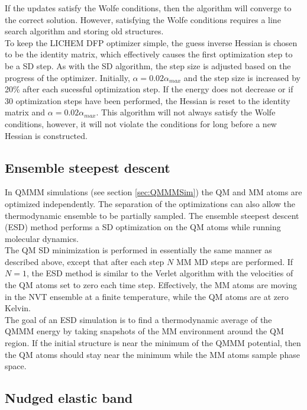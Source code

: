 \documentclass[12pt]{report}
\begin{document}
If the updates satisfy the Wolfe conditions, then the algorithm will converge
to the correct solution.
However, satisfying the Wolfe conditions requires a line search algorithm and
storing old structures. \\

To keep the LICHEM DFP optimizer simple, the guess inverse Hessian is chosen
to be the identity matrix, which effectively causes the first optimization
step to be a SD step.
As with the SD algorithm, the step size is adjusted based on the progress of
the optimizer.
Initially, $\alpha=0.02\alpha_{max}$ and the step size is increased by 20\%
after each sucessful optimization step.
If the energy does not decrease or if 30 optimization steps have been
performed, the Hessian is reset to the identity matrix and
$\alpha=0.02\alpha_{max}$.
This algorithm will not always satisfy the Wolfe conditions, however, it will
not violate the conditions for long before a new Hessian is constructed.

\subsection{Ensemble steepest descent}

In QMMM simulations (see section \ref{sec:QMMMSim}) the QM and MM atoms are
optimized independently.
The separation of the optimizations can also allow the thermodynamic ensemble
to be partially sampled.
The ensemble steepest descent (ESD) method performs a SD optimization on the
QM atoms while running molecular dynamics. \\

The QM SD minimization is performed in essentially the same manner as described
above, except that after each step $N$ MM MD steps are performed.
If $N=1$, the ESD method is similar to the Verlet algorithm with the
velocities of the QM atoms set to zero each time step.
Effectively, the MM atoms are moving in the NVT ensemble at a finite
temperature, while the QM atoms are at zero Kelvin. \\

The goal of an ESD simulation is to find a thermodynamic average of the QMMM
energy by taking snapshots of the MM environment around the QM region.
If the initial structure is near the minimum of the QMMM potential, then the
QM atoms should stay near the minimum while the MM atoms sample phase space.

\subsection{Nudged elastic band}
\end{document}

